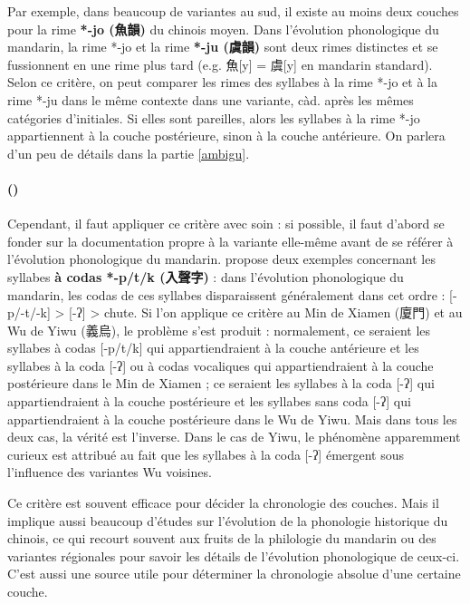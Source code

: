 \documentclass{scrbook}
\newcounter{c}[subsubsection]
\newcommand{\stpc}[1]{\stepcounter{#1}}
\newcommand{\termyyx}[1]{\textbf{#1}}
\begin{document}
\begin{sloppypar}
Par exemple, dans beaucoup de variantes au sud, il existe au moins deux couches pour la rime \termyyx{*-jo (魚韻)} du chinois moyen. Dans l'évolution phonologique du mandarin, la rime *-jo et la rime \termyyx{*-ju (虞韻)} sont deux rimes distinctes et se fussionnent en une rime plus tard (e.g. 魚[y] = 虞[y] en mandarin standard). Selon ce critère, on peut comparer les rimes des syllabes à la rime *-jo et à la rime *-ju dans le même contexte dans une variante, càd. après les mêmes catégories d'initiales. Si elles sont pareilles, alors les syllabes à la rime *-jo appartiennent à la couche postérieure, sinon à la couche antérieure. On parlera d'un peu de détails dans la partie \ref{ambigu}.

\stpc{c}\paragraph{()}
Cependant, il faut appliquer ce critère avec soin : si possible, il faut d'abord se fonder sur la documentation propre à la variante elle-même avant de se référer à l'évolution phonologique du mandarin. \textcite{Chen2005couche} propose deux exemples concernant les syllabes \termyyx{à codas *-p/t/k (入聲字)} : dans l'évolution phonologique du mandarin, les codas de ces syllabes disparaissent généralement dans cet ordre : [-p/-t/-k] > [-ʔ] > chute. Si l'on applique ce critère au Min de Xiamen (廈門) et au Wu de Yiwu (義烏), le problème s'est produit : normalement, ce seraient les syllabes à codas [-p/t/k] qui appartiendraient à la couche antérieure et les syllabes à la coda [-ʔ] ou à codas vocaliques qui appartiendraient à la couche postérieure dans le Min de Xiamen ; ce seraient les syllabes à la coda [-ʔ] qui appartiendraient à la couche postérieure et les syllabes sans coda [-ʔ] qui appartiendraient à la couche postérieure dans le Wu de Yiwu. Mais dans tous les deux cas, la vérité est l'inverse. Dans le cas de Yiwu, le phénomène apparemment curieux est attribué au fait que les syllabes à la coda [-ʔ]
émergent sous l'influence des variantes Wu voisines. %

Ce critère est souvent efficace pour décider la chronologie des couches. Mais il implique aussi beaucoup d'études sur l'évolution de la phonologie historique du chinois, ce qui recourt souvent aux fruits de la philologie du mandarin ou des variantes régionales pour savoir les détails de l'évolution phonologique de ceux-ci. C'est aussi une source utile pour déterminer la chronologie absolue d'une certaine couche. %


\end{sloppypar}
\end{document}
